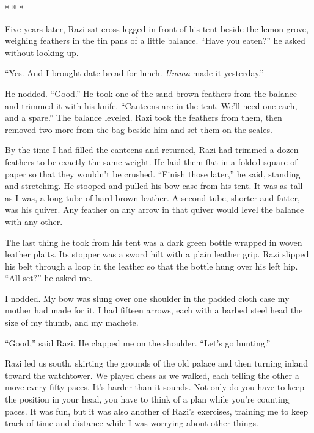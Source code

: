 
\begin{center}* * *\end{center}

Five years later, Razi sat cross-legged in front of his tent beside
the lemon grove, weighing feathers in the tin pans of a little
balance.  ``Have you eaten?''  he asked without looking up.

``Yes.  And I brought date bread for lunch.  \emph{Umma} made it yesterday.''

He nodded.  ``Good.''  He took one of the sand-brown feathers from the
balance and trimmed it with his knife.  ``Canteens are in the tent.
We'll need one each, and a spare.''  The balance leveled.  Razi took
the feathers from them, then removed two more from the bag beside him
and set them on the scales.

By the time I had filled the canteens and returned, Razi had trimmed a
dozen feathers to be exactly the same weight.  He laid them flat in a
folded square of paper so that they wouldn't be crushed.  ``Finish
those later,'' he said, standing and stretching.  He stooped and pulled
his bow case from his tent.  It was as tall as I was, a long tube of
hard brown leather.  A second tube, shorter and fatter, was his
quiver.  Any feather on any arrow in that quiver would level the
balance with any other.

The last thing he took from his tent was a dark green bottle wrapped
in woven leather plaits.  Its stopper was a sword hilt with a plain
leather grip.  Razi slipped his belt through a loop in the leather so
that the bottle hung over his left hip.  ``All set?''  he asked me.

I nodded.  My bow was slung over one shoulder in the padded cloth case
my mother had made for it.  I had fifteen arrows, each with a barbed
steel head the size of my thumb, and my machete.

``Good,'' said Razi.  He clapped me on the shoulder.  ``Let's go
hunting.''

Razi led us south, skirting the grounds of the old palace and then
turning inland toward the watchtower.  We played chess as we walked,
each telling the other a move every fifty paces.  It's harder than it
sounds.  Not only do you have to keep the position in your head, you
have to think of a plan while you're counting paces.  It was fun, but
it was also another of Razi's exercises, training me to keep track of
time and distance while I was worrying about other things.

